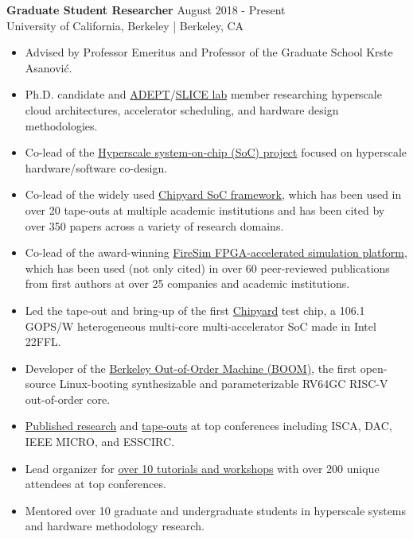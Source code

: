 \documentclass[line]{res}
\begin{document}
\begin{resume}
\textbf{Graduate Student Researcher} \hfill August 2018 - Present
\\
University of California, Berkeley | Berkeley, CA
\\
\vspace{-3mm}
\begin{itemize}
\item Advised by Professor Emeritus and Professor of the Graduate School Krste Asanovi\'c.
\item Ph.D. candidate and \href{https://adept.eecs.berkeley.edu/}{ADEPT}/\href{https://slice.eecs.berkeley.edu/}{SLICE lab} member researching hyperscale cloud architectures, accelerator scheduling, and hardware design methodologies.
\item Co-lead of the \hyperref[sec:hyperscale-soc]{Hyperscale system-on-chip (SoC) project} focused on hyperscale hardware/software co-design.
\item Co-lead of the widely used \hyperref[sec:chipyard]{Chipyard SoC framework}, which has been used in over 20 tape-outs at multiple academic institutions and has been cited by over 350 papers across a variety of research domains.
\item Co-lead of the award-winning \hyperref[sec:firesim]{FireSim FPGA-accelerated simulation platform}, which has been used (not only cited) in over 60 peer-reviewed publications from first authors at over 25 companies and academic institutions.
\item Led the tape-out and bring-up of the first \hyperref[sec:chipyard]{Chipyard} test chip, a 106.1 GOPS/W heterogeneous multi-core multi-accelerator SoC made in Intel 22FFL.
\item Developer of the \hyperref[sec:boom]{Berkeley Out-of-Order Machine (BOOM)}, the first open-source Linux-booting synthesizable and parameterizable RV64GC RISC-V out-of-order core.
\item \hyperref[sec:pubs]{Published research} and \hyperref[sec:beagle]{tape-outs} at top conferences including ISCA, DAC, IEEE MICRO, and ESSCIRC.
\item Lead organizer for \hyperref[sec:tutorialsworkshops]{over 10 tutorials and workshops} with over 200 unique attendees at top conferences.
\item Mentored over 10 graduate and undergraduate students in hyperscale systems and hardware methodology research.
\end{itemize}

\vspace{-1mm}


\end{resume}
\end{document}
